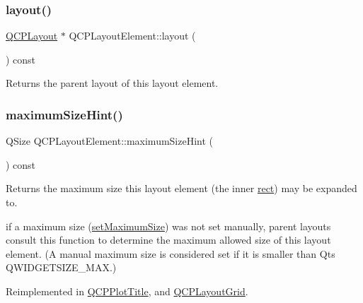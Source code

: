 \hypertarget{class_q_c_p_layout_element_a4efdcbde9d28f410e5ef166c9d691deb}{}\label{class_q_c_p_layout_element_a4efdcbde9d28f410e5ef166c9d691deb} 
\subsubsection{\texorpdfstring{layout()}{layout()}}
{\footnotesize\ttfamily \hyperlink{class_q_c_p_layout}{Q\+C\+P\+Layout} $\ast$ Q\+C\+P\+Layout\+Element\+::layout (\begin{DoxyParamCaption}{ }\end{DoxyParamCaption}) const\hspace{0.3cm}{\ttfamily [inline]}}

Returns the parent layout of this layout element. \hypertarget{class_q_c_p_layout_element_ab5ce2ba22b36d9a3b70a1be562c326e5}{}\label{class_q_c_p_layout_element_ab5ce2ba22b36d9a3b70a1be562c326e5} 
\subsubsection{\texorpdfstring{maximum\+Size\+Hint()}{maximumSizeHint()}}
{\footnotesize\ttfamily Q\+Size Q\+C\+P\+Layout\+Element\+::maximum\+Size\+Hint (\begin{DoxyParamCaption}{ }\end{DoxyParamCaption}) const\hspace{0.3cm}{\ttfamily [virtual]}}

Returns the maximum size this layout element (the inner \hyperlink{class_q_c_p_layout_element_a208effccfe2cca4a0eaf9393e60f2dd4}{rect}) may be expanded to.

if a maximum size (\hyperlink{class_q_c_p_layout_element_a74eb5280a737ab44833d506db65efd95}{set\+Maximum\+Size}) was not set manually, parent layouts consult this function to determine the maximum allowed size of this layout element. (A manual maximum size is considered set if it is smaller than Qt\textquotesingle{}s Q\+W\+I\+D\+G\+E\+T\+S\+I\+Z\+E\+\_\+\+M\+AX.) 

Reimplemented in \hyperlink{class_q_c_p_plot_title_ae24c395b5d3be64b42dcb9e27ed023c4}{Q\+C\+P\+Plot\+Title}, and \hyperlink{class_q_c_p_layout_grid_a3720d1b79931b2bdec3f2158a5f0181c}{Q\+C\+P\+Layout\+Grid}.

